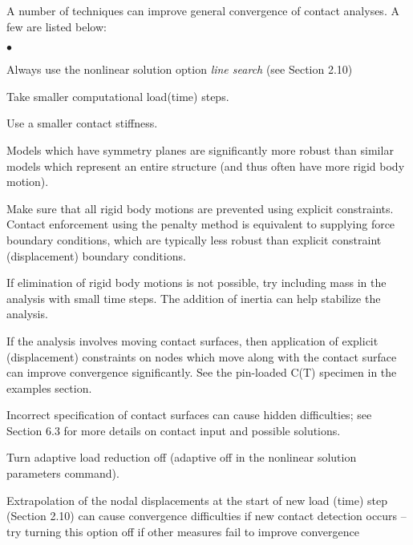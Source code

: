 \documentclass[11pt]{report}
\numberwithin{equation}{section}
\newcommand{\ti}{\emph}
\newcommand{\noi}{\noindent}
\newcommand{\squishlist}{
 \begin{list}{$\bullet$}
  { \setlength{\itemsep}{0pt}
     \setlength{\parsep}{3pt}
     \setlength{\topsep}{3pt}
     \setlength{\partopsep}{0pt}
     \setlength{\leftmargin}{1.5em}
     \setlength{\labelwidth}{1em}
     \setlength{\labelsep}{0.5em} } }
\newcommand{\squishend}{
  \end{list}  }
\begin{document}
\noi A number of techniques can improve general convergence 
of contact analyses. A few are listed below:
\small
\squishlist
\item Always use the nonlinear solution option \ti{line search} (see Section 2.10)
\item Take smaller computational load(time) steps.
\item Use a smaller contact stiffness.
\item Models which have symmetry planes are significantly more robust than similar models
 which represent an entire structure (and thus often have more rigid body motion).
\item Make sure that all rigid body motions are prevented using explicit constraints. 
Contact enforcement using the penalty method is equivalent to supplying force 
boundary conditions, which are typically less robust than explicit constraint 
(displacement) boundary conditions.
\item If elimination of rigid body motions is not possible, try including mass 
in the analysis with small time steps. The addition of inertia can help 
stabilize the analysis.
\item If the analysis involves moving contact surfaces, then application of 
explicit (displacement) constraints on nodes which move along with the contact surface 
can improve convergence significantly. See the pin-loaded C(T) specimen 
in the examples section. 
\item Incorrect specification of contact surfaces can cause hidden 
difficulties; see Section 6.3 for more details on contact input and possible solutions.
\item Turn adaptive load reduction off (adaptive off in the nonlinear 
solution parameters command).
\item Extrapolation of the nodal displacements at the start of new load (time) step 
(Section 2.10) can cause convergence
difficulties if new contact detection occurs -- try turning this option 
off if other measures fail to improve convergence
\squishend
\normalsize
\end{document}
